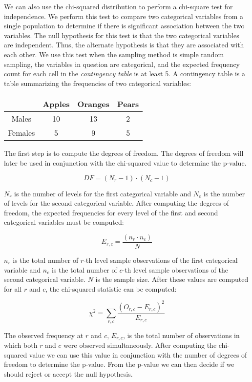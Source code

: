 \documentclass{article}
\begin{document}
We can also use the chi-squared distribution to perform a chi-square test for independence. We perform this test to compare two categorical variables from a single population to determine if there is significant association between the two variables. The null hypothesis for this test is that the two categorical variables are independent. Thus, the alternate hypothesis is that they are associated with each other. We use this test when the sampling method is simple random sampling, the variables in question are categorical, and the expected frequency count for each cell in the \textit{contingency table} is at least 5. A contingency table is a table summarizing the frequencies of two categorical variables:
\begin{center}
\begin{tabular}{ c | c c c }
    \hspace{1mm} & Apples & Oranges & Pears \\ 
    \hline
    Males & 10 & 13 & 2 \\  
    Females & 5 & 9 & 5   
\end{tabular}
\end{center}

\noindent
The first step is to compute the degrees of freedom. The degrees of freedom will later be used in conjunction with the chi-squared value to determine the p-value. 

\[DF = (N_r - 1) \cdot (N_c - 1)\]

\noindent
$N_r$ is the number of levels for the first categorical variable and $N_c$ is the number of levels for the second categorical variable. After computing the degrees of freedom, the expected frequencies for every level of the first and second categorical variables must be computed:

\[E_{r, c} = \frac{(n_r \cdot n_c)}{N}\]

\noindent
$n_r$ is the total number of $r$-th level sample observations of the first categorical variable and $n_c$ is the total number of $c$-th level sample observations of the second categorical variable. $N$ is the sample size. After these values are computed for all $r$ and $c$, the chi-squared statistic can be computed:

\[\chi^2 = \sum_{r, c}\frac{(O_{r, c} - E_{r, c})^2}{E_{r, c}}\]

\noindent
The observed frequency at $r$ and $c$, $E_{r, c}$, is the total number of observations in which both $r$ and $c$ were observed simultaneously. After computing the chi-squared value we can use this value in conjunction with the number of degrees of freedom to determine the p-value. From the p-value we can then decide if we should reject or accept the null hypothesis. 
\end{document}
